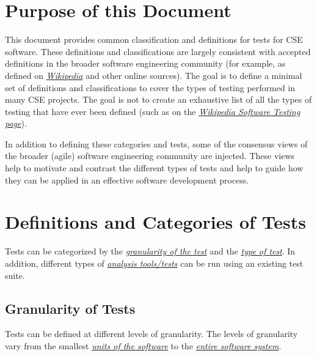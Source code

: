 \documentclass[]{article}
\begin{document}
\hypertarget{purpose-of-this-document}{\section{Purpose of this
Document}\label{purpose-of-this-document}}

This document provides common classification and definitions for tests
for CSE software. These definitions and classifications are largely
consistent with accepted definitions in the broader software engineering
community (for example, as defined on
\href{http://en.wikipedia.org/wiki/Software_testing}{\emph{Wikipedia}}
and other online sources). The goal is to define a minimal set of
definitions and classifications to cover the types of testing performed
in many CSE projects. The goal is not to create an exhaustive list of
all the types of testing that have ever been defined (such as on the
\href{http://en.wikipedia.org/wiki/Software_testing}{\emph{Wikipedia
Software Testing page}}).

In addition to defining these categories and tests, some of the
consensus views of the broader (agile) software engineering community
are injected. These views help to motivate and contrast the different
types of tests and help to guide how they can be applied in an effective
software development process.

\hypertarget{definitions-and-categories-of-tests}{\section{Definitions
and Categories of Tests}\label{definitions-and-categories-of-tests}}

Tests can be categorized by the
\protect\hyperlink{granularity-of-tests}{\emph{granularity of the test}}
and the \protect\hyperlink{types-of-tests}{\emph{type of test}}. In
addition, different types of
\protect\hyperlink{test-analysis-tools}{\emph{analysis tools/tests}} can
be run using an existing test suite.

\hypertarget{granularity-of-tests}{\subsection{Granularity of
Tests}\label{granularity-of-tests}}

Tests can be defined at different levels of granularity. The levels of
granularity vary from the smallest
\protect\hyperlink{id.5saje75168fl}{\emph{units of the software}} to the
\protect\hyperlink{id.vllu2z1lvhtb}{\emph{entire software system}}.
\end{document}
